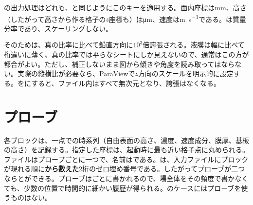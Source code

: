 \begin{warn}
  の出力処理はどれも、と同じようにこのキーを適用する。面内座標は\si{\milli\metre}、高さ（したがって高さから作る格子の$z$座標も）は\si{\micro\metre}、速度は\si{\metre\per\second}である。は質量分率であり、スケーリングしない。

  そのためは、真の比率に比べて鉛直方向に$10^{3}$倍誇張される。液膜は幅に比べて桁違いに薄く、真の比率では平らなシートにしか見えないので、通常はこの方が都合がよい。ただし、補正しないまま図から傾きや角度を読み取ってはならない。実際の縦横比が必要なら、ParaViewで$z$方向のスケールを明示的に設定する。をにすると、ファイル内はすべて無次元となり、誇張はなくなる。
\end{warn}

\section{プローブ}
\label{sec:output:probes}

各ブロックは、一点での時系列（自由表面の高さ、濃度、速度成分、膜厚、基板の高さ）を記録する。指定した座標は、起動時に最も近い格子点に丸められる。ファイルはプローブごとに一つで、名前はである。は、入力ファイルにブロックが現れる順に\textbf{から数えた}2桁のゼロ埋め番号である。したがってプローブが二つならとができる。プローブはごとに書かれるので、場全体をその頻度で書かなくても、少数の位置で時間的に細かい履歴が得られる。のケースにはプローブを使うものはない。
